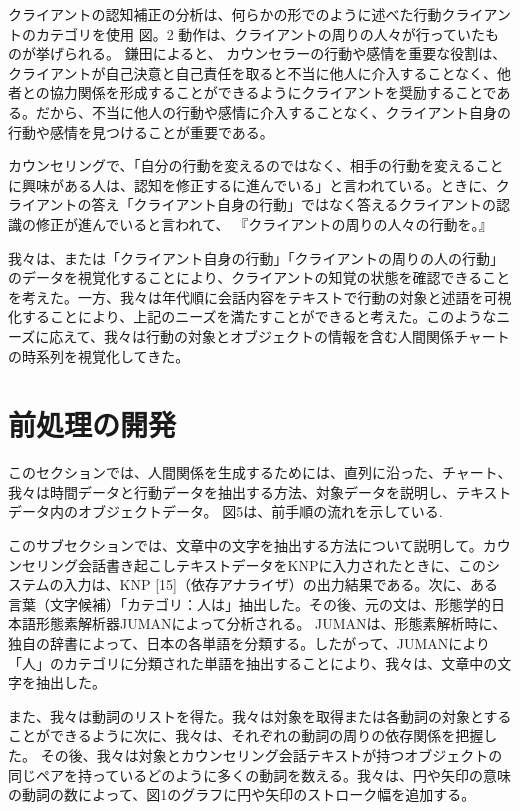 \documentclass[shuuron]{kuee}
\begin{document}
クライアントの認知補正の分析は、何らかの形でのように述べた行動クライアントのカテゴリを使用 図。2 動作は、クライアントの周りの人々が行っていたものが挙げられる。 鎌田によると\cite{kamata2002}、 カウンセラーの行動や感情を重要な役割は、クライアントが自己決意と自己責任を取ると不当に他人に介入することなく、他者との協力関係を形成することができるようにクライアントを奨励することである。だから、不当に他人の行動や感情に介入することなく、クライアント自身の行動や感情を見つけることが重要である。

  カウンセリングで、「自分の行動を変えるのではなく、相手の行動を変えることに興味がある人は、認知を修正するに進んでいる」と言われている。ときに、クライアントの答え「クライアント自身の行動」ではなく答えるクライアントの認識の修正が進んでいると言われて、 『クライアントの周りの人々の行動を。』

  我々は、または「クライアント自身の行動」「クライアントの周りの人の行動」のデータを視覚化することにより、クライアントの知覚の状態を確認できることを考えた。一方、我々は年代順に会話内容をテキストで行動の対象と述語を可視化することにより、上記のニーズを満たすことができると考えた。このようなニーズに応えて、我々は行動の対象とオブジェクトの情報を含む人間関係チャートの時系列を視覚化してきた。



\section{前処理の開発}

  このセクションでは、人間関係を生成するためには、直列に沿った、チャート、我々は時間データと行動データを抽出する方法、対象データを説明し、テキストデータ内のオブジェクトデータ。 図5は、前手順の流れを示している.

  このサブセクションでは、文章中の文字を抽出する方法について説明して。カウンセリング会話書き起こしテキストデータをKNPに入力されたときに、このシステムの入力は、KNP [15]（依存アナライザ）の出力結果である。次に、ある言葉（文字候補）「カテゴリ：人は」抽出した。その後、元の文は、形態学的日本語形態素解析器JUMAN\cite{juman}によって分析される。 JUMANは、形態素解析時に、独自の辞書によって、日本の各単語を分類する。したがって、JUMANにより「人」のカテゴリに分類された単語を抽出することにより、我々は、文章中の文字を抽出した。

  また、我々は動詞のリストを得た。我々は対象を取得または各動詞の対象とすることができるように次に、我々は、それぞれの動詞の周りの依存関係を把握した。
  その後、我々は対象とカウンセリング会話テキストが持つオブジェクトの同じペアを持っているどのように多くの動詞を数える。我々は、円や矢印の意味の動詞の数によって、図1のグラフに円や矢印のストローク幅を追加する。
\end{document}
